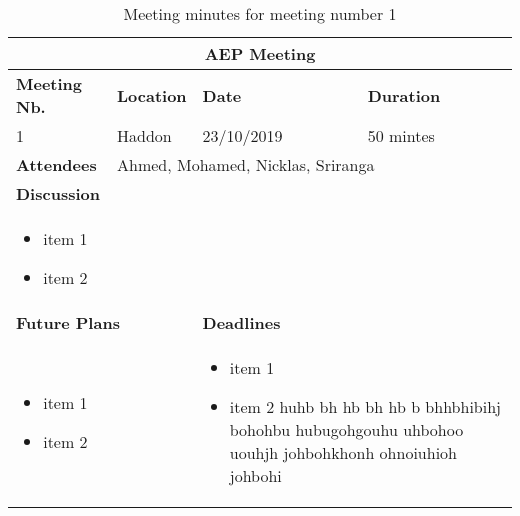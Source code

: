 \renewcommand\mTitle{\textbf{AEP Meeting}}
\renewcommand\mNumber{1}
\renewcommand\mLocation{Haddon}
\renewcommand\mDate{23/10/2019}
\renewcommand\mDuration{50 mintes}
\renewcommand\mAttendies{Ahmed, Mohamed, Nicklas, Sriranga}
\renewcommand\mMinuteTaker{Mohamed}
\renewcommand\mDiscussion{
    \begin{minipage}[t]{0.955\textwidth}
    \begin{itemize}
    \item item 1
    \item item 2
    \end{itemize} \vspace{1mm}
  \end{minipage}}
\renewcommand\mFuturePlans{
    \begin{minipage}[t]{0.45\textwidth}
    \begin{itemize}
    \item item 1
    \item item 2
    \end{itemize}  \vspace{1mm}
  \end{minipage}}
\renewcommand\mDeadlines{
    \begin{minipage}[t]{0.45\textwidth}
    \begin{itemize}
    \item item 1
    \item item 2 huhb bh hb bh hb b bhhbhibihj bohohbu hubugohgouhu uhbohoo uouhjh johbohkhonh ohnoiuhioh johbohi 
    \end{itemize}  \vspace{1mm}
  \end{minipage}}

\begin{table}[h]
    \centering
\begin{tabularx}{\textwidth}{l|l|l|l}
\hline
\multicolumn{4}{c}{\mTitle}  \\ 
\hline
    \textbf{Meeting Nb.} & \textbf{Location} & \textbf{Date} & \textbf{Duration} \\
    \mNumber  & \mLocation & \mDate & \mDuration \\ 
    \hline
    \textbf{Attendees} & \multicolumn{3}{l}{\mAttendies}\\ 
    \hline
    \multicolumn{4}{l}{\textbf{Discussion}} \\  [1ex]
    \multicolumn{4}{l}{\mDiscussion} \\ \hline
    \multicolumn{2}{l}{\textbf{Future Plans}} \vline & \multicolumn{2}{l}{\textbf{Deadlines}}\\  [1ex]
    \multicolumn{2}{l}{\mFuturePlans} \vline &
    \multicolumn{2}{l}{\mDeadlines} \\\hline
\end{tabularx}
\caption{Meeting minutes for meeting number \mNumber}
\end{table}